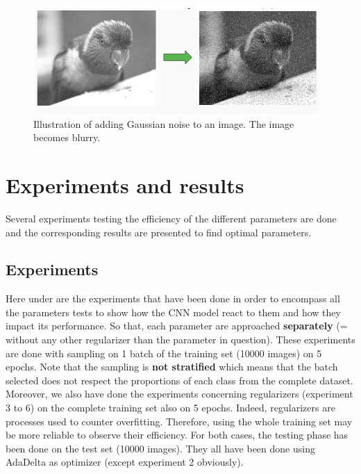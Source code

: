 \documentclass[11pt, openany]{report}
\theoremstyle{plain}
\theoremstyle{definition}
\theoremstyle{remark}
\begin{document}
\begin{figure}[h]
  \centering
  \includegraphics[scale=1]{figures/gaussian-noise.png}
  \caption{Illustration of adding Gaussian noise to an image. The image becomes blurry.}
  \label{fig:gaussian-noise}
\end{figure}

 

\section{Experiments and results}

Several experiments testing the efficiency of the different parameters are done and the corresponding results are presented to find optimal parameters. 

\subsection{Experiments} \label{sec:exp-cnn}
Here under are the experiments that have been done in order to encompass all the parameters tests to show how the CNN model react to them and how they impact its performance. So that, each parameter are approached \textbf{separately} (= without any other regularizer than the parameter in question). These experiments are done with sampling on 1 batch of the training set (10000 images) on 5 epochs. Note that the sampling is \textbf{not stratified} which means that the batch selected does not respect the proportions of each class from the complete dataset. Moreover, we also have done the experiments concerning regularizers (experiment 3 to 6) on the complete training set also on 5 epochs. Indeed, regularizers are processes used to counter overfitting. Therefore, using the whole training set may be more reliable to observe their efficiency. For both cases, the testing phase has been done on the test set (10000 images). They all have been done using AdaDelta as optimizer (except experiment 2 obviously). 
\end{document}
